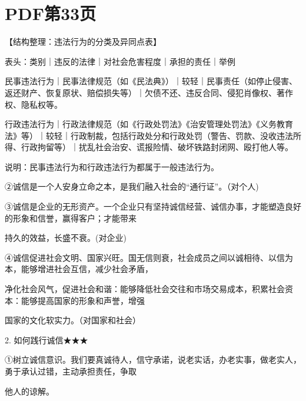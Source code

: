 \documentclass[lang=cn,11pt]{elegantbook}
\newcommand{\daofasym}[1]{{\daofasymbolfont #1}}
\newcommand{\daofasym}[1]{#1}
\begin{document}
\section*{PDF第33页}

【结构整理：违法行为的分类及异同点表】\par

表头：类别｜违反的法律｜对社会危害程度｜承担的责任｜举例\par

民事违法行为｜民事法律规范（如《民法典》）｜较轻｜民事责任（如停止侵害、返还财产、恢复原状、赔偿损失等）｜欠债不还、违反合同、侵犯肖像权、著作权、隐私权等。\par

行政违法行为｜行政法律规范（如《行政处罚法》《治安管理处罚法》《义务教育法》等）｜较轻｜行政制裁，包括行政处分和行政处罚（警告、罚款、没收违法所得、行政拘留等）｜扰乱社会治安、谎报险情、破坏铁路封闭网、殴打他人等。\par

说明：民事违法行为和行政违法行为都属于一般违法行为。\par

\daofasym{②}诚信是一个人安身立命之本，是我们融入社会的“通行证”。（对个人)\par

\daofasym{③}诚信是企业的无形资产。一个企业只有坚持诚信经营、诚信办事，才能塑造良好的形象和信誉，赢得客户；才能带来\par

持久的效益，长盛不衰。(对企业)\par

\daofasym{④}诚信促进社会文明、国家兴旺。国无信则衰，社会成员之间以诚相待、以信为本，能够增进社会互信，减少社会矛盾，\par

净化社会风气，促进社会和谐：能够降低社会交往和市场交易成本，积累社会资本：能够提高国家的形象和声誉，增强\par

国家的文化软实力。（对国家和社会）\par

2. 如何践行诚信\daofasym{★}\daofasym{★}\daofasym{★}\par

\daofasym{①}树立诚信意识。我们要真诚待人，信守承诺，说老实话，办老实事，做老实人，勇于承认过错，主动承担责任，争取\par

他人的谅解。\par
\end{document}
